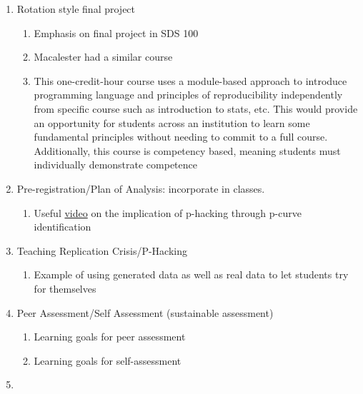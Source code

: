 \documentclass{article}
\begin{document}
\begin{enumerate}
\def\labelenumi{\arabic{enumi}.}
\item
  Rotation style final project

  \begin{enumerate}
  \def\labelenumii{\alph{enumii}}
  \item
    Emphasis on final project in SDS 100\\
  \item
    Macalester had a similar course\\
  \item
    This one-credit-hour course uses a module-based approach to
    introduce programming language and principles of reproducibility
    independently from specific course such as introduction to stats,
    etc. This would provide an opportunity for students across an
    institution to learn some fundamental principles without needing to
    commit to a full course. Additionally, this course is competency
    based, meaning students must individually demonstrate competence\\
  \end{enumerate}
\item
  Pre-registration/Plan of Analysis: incorporate in classes.

  \begin{enumerate}
  \def\labelenumii{\alph{enumii}}
  \item
    Useful
    \href{https://www.bitss.org/education/mooc-parent-page/week-2-publication-bias/detecting-and-reducing-publication-bias/p-curve-a-tool-for-detecting-publication-bias/}{video}
    on the implication of p-hacking through p-curve identification\\
  \end{enumerate}
\item
  Teaching Replication Crisis/P-Hacking

  \begin{enumerate}
  \def\labelenumii{\alph{enumii}}
  \item
    Example of using generated data as well as real data to let students
    try for themselves\\
  \end{enumerate}
\item
  Peer Assessment/Self Assessment (sustainable assessment)

  \begin{enumerate}
  \def\labelenumii{\alph{enumii}}
  \item
    Learning goals for peer assessment\\
  \item
    Learning goals for self-assessment\\
  \end{enumerate}
\item
  



\end{enumerate}
\end{document}
